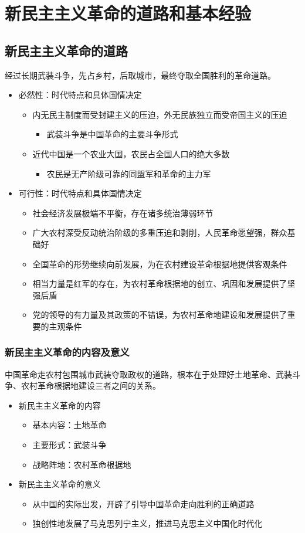 \documentclass[12pt,openany]{ctexbook}
\begin{document}
\section{新民主主义革命的道路和基本经验}
\subsection{新民主主义革命的道路}
经过长期武装斗争，先占乡村，后取城市，最终夺取全国胜利的革命道路。
\begin{itemize}
  \item 必然性：时代特点和具体国情决定
\begin{itemize}
  \item 内无民主制度而受封建主义的压迫，外无民族独立而受帝国主义的压迫
\begin{itemize}
  \item 武装斗争是中国革命的主要斗争形式
\end{itemize}
  \item 近代中国是一个农业大国，农民占全国人口的绝大多数
\begin{itemize}
  \item 农民是无产阶级可靠的同盟军和革命的主力军
\end{itemize}
\end{itemize}
  \item 可行性：时代特点和具体国情决定
\begin{itemize}
  \item 社会经济发展极端不平衡，存在诸多统治薄弱环节
  \item 广大农村深受反动统治阶级的多重压迫和剥削，人民革命愿望强，群众基础好
  \item 全国革命的形势继续向前发展，为在农村建设革命根据地提供客观条件
  \item 相当力量是红军的存在，为农村革命根据地的创立、巩固和发展提供了坚强后盾
  \item 党的领导的有力量及其政策的不错误，为农村革命地建设和发展提供了重要的主观条件
\end{itemize}
\end{itemize}
\subsubsection{新民主主义革命的内容及意义}
中国革命走农村包围城市武装夺取政权的道路，根本在于处理好土地革命、武装斗争、农村革命根据地建设三者之间的关系。
\begin{itemize}
  \item 新民主主义革命的内容
\begin{itemize}
  \item 基本内容：土地革命
  \item 主要形式：武装斗争
  \item 战略阵地：农村革命根据地
\end{itemize}
  \item 新民主主义革命的意义
\begin{itemize}
  \item 从中国的实际出发，开辟了引导中国革命走向胜利的正确道路
  \item 独创性地发展了马克思列宁主义，推进马克思主义中国化时代化
\end{itemize}
\end{itemize}
\end{document}
